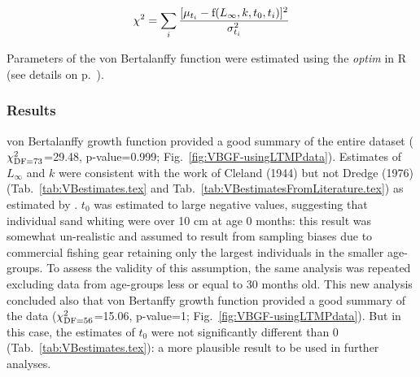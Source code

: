 \begin{equation}
\chi^{2} = \sum_{i} \frac{ [ \mu_{t_{i}} - {\rm f}(L_{\infty}, k, t_{0},t_{i}) ] ^{2}}{\sigma_{t_{i}}^2}
\end{equation}

Parameters of the von Bertalanffy function were estimated using the {\it optim} in R \cite{R} (see details on p.~\pageref{code:VBGFestimation}).\\

\subsubsection{Results}

von Bertalanffy growth function provided a good summary of the entire dataset ($\chi^{2}_{\rm{DF}=73}$=29.48, p-value=0.999; Fig.~\ref{fig:VBGF-usingLTMPdata}). Estimates of $L_{\infty}$ and $k$ were consistent with the work of Cleland (1944) but not Dredge (1976) (Tab.~\ref{tab:VBestimates.tex} and Tab.~\ref{tab:VBestimatesFromLiterature.tex}) as estimated by \cite{HoyR2000}. $t_{0}$ was estimated to large negative values, suggesting that individual sand whiting were over 10 cm at age 0 months: this result was somewhat un-realistic and assumed to result from sampling biases due to commercial fishing gear retaining only the largest individuals in the smaller age-groups. To assess the validity of this assumption, the same analysis was repeated excluding data from age-groups less or equal to 30 months old. This new analysis concluded also that von Bertanffy growth function provided a good summary of the data ($\chi^{2}_{\rm{DF}=56}$=15.06, p-value=1; Fig.~\ref{fig:VBGF-usingLTMPdata}). But in this case, the estimates of $t_{0}$ were not significantly different than 0 (Tab.~\ref{tab:VBestimates.tex}): a more plausible result to be used in further analyses.



